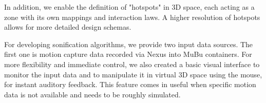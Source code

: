 


In addition, we enable the definition of "hotspots" in 3D space, each acting as a zone with its own mappings and interaction laws. A higher resolution of hotspots allows for more detailed design schemas.


For developing sonification algorithms, we provide two input data sources. The first one is motion capture data recorded via Nexus into MuBu containers. For more flexibility and immediate control, we also created a basic visual interface to monitor the input data and to manipulate it in virtual 3D space using the mouse, for instant auditory feedback. This feature comes in useful when specific motion data is not available and needs to be roughly simulated.

